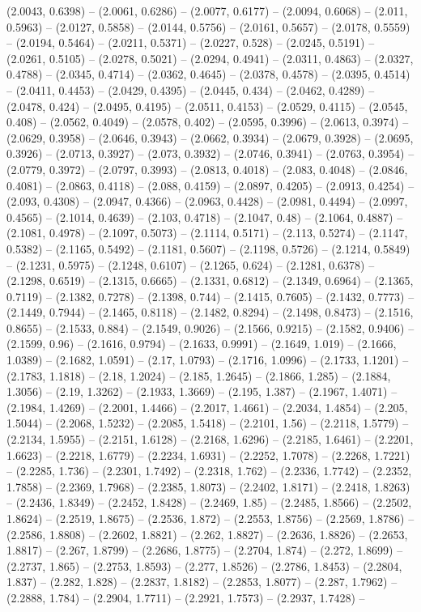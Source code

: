 (2.0043, 0.6398) -- (2.0061, 0.6286) -- (2.0077, 0.6177) -- (2.0094, 0.6068) -- (2.011, 0.5963) -- (2.0127, 0.5858) -- (2.0144, 0.5756) -- (2.0161, 0.5657) -- (2.0178, 0.5559) -- (2.0194, 0.5464) -- (2.0211, 0.5371) -- (2.0227, 0.528) -- (2.0245, 0.5191) -- (2.0261, 0.5105) -- (2.0278, 0.5021) -- (2.0294, 0.4941) -- (2.0311, 0.4863) -- (2.0327, 0.4788) -- (2.0345, 0.4714) -- (2.0362, 0.4645) -- (2.0378, 0.4578) -- (2.0395, 0.4514) -- (2.0411, 0.4453) -- (2.0429, 0.4395) -- (2.0445, 0.434) -- (2.0462, 0.4289) -- (2.0478, 0.424) -- (2.0495, 0.4195) -- (2.0511, 0.4153) -- (2.0529, 0.4115) -- (2.0545, 0.408) -- (2.0562, 0.4049) -- (2.0578, 0.402) -- (2.0595, 0.3996) -- (2.0613, 0.3974) -- (2.0629, 0.3958) -- (2.0646, 0.3943) -- (2.0662, 0.3934) -- (2.0679, 0.3928) -- (2.0695, 0.3926) -- (2.0713, 0.3927) -- (2.073, 0.3932) -- (2.0746, 0.3941) -- (2.0763, 0.3954) -- (2.0779, 0.3972) -- (2.0797, 0.3993) -- (2.0813, 0.4018) -- (2.083, 0.4048) -- (2.0846, 0.4081) -- (2.0863, 0.4118) -- (2.088, 0.4159) -- (2.0897, 0.4205) -- (2.0913, 0.4254) -- (2.093, 0.4308) -- (2.0947, 0.4366) -- (2.0963, 0.4428) -- (2.0981, 0.4494) -- (2.0997, 0.4565) -- (2.1014, 0.4639) -- (2.103, 0.4718) -- (2.1047, 0.48) -- (2.1064, 0.4887) -- (2.1081, 0.4978) -- (2.1097, 0.5073) -- (2.1114, 0.5171) -- (2.113, 0.5274) -- (2.1147, 0.5382) -- (2.1165, 0.5492) -- (2.1181, 0.5607) -- (2.1198, 0.5726) -- (2.1214, 0.5849) -- (2.1231, 0.5975) -- (2.1248, 0.6107) -- (2.1265, 0.624) -- (2.1281, 0.6378) -- (2.1298, 0.6519) -- (2.1315, 0.6665) -- (2.1331, 0.6812) -- (2.1349, 0.6964) -- (2.1365, 0.7119) -- (2.1382, 0.7278) -- (2.1398, 0.744) -- (2.1415, 0.7605) -- (2.1432, 0.7773) -- (2.1449, 0.7944) -- (2.1465, 0.8118) -- (2.1482, 0.8294) -- (2.1498, 0.8473) -- (2.1516, 0.8655) -- (2.1533, 0.884) -- (2.1549, 0.9026) -- (2.1566, 0.9215) -- (2.1582, 0.9406) -- (2.1599, 0.96) -- (2.1616, 0.9794) -- (2.1633, 0.9991) -- (2.1649, 1.019) -- (2.1666, 1.0389) -- (2.1682, 1.0591) -- (2.17, 1.0793) -- (2.1716, 1.0996) -- (2.1733, 1.1201) -- (2.1783, 1.1818) -- (2.18, 1.2024) -- (2.185, 1.2645) -- (2.1866, 1.285) -- (2.1884, 1.3056) -- (2.19, 1.3262) -- (2.1933, 1.3669) -- (2.195, 1.387) -- (2.1967, 1.4071) -- (2.1984, 1.4269) -- (2.2001, 1.4466) -- (2.2017, 1.4661) -- (2.2034, 1.4854) -- (2.205, 1.5044) -- (2.2068, 1.5232) -- (2.2085, 1.5418) -- (2.2101, 1.56) -- (2.2118, 1.5779) -- (2.2134, 1.5955) -- (2.2151, 1.6128) -- (2.2168, 1.6296) -- (2.2185, 1.6461) -- (2.2201, 1.6623) -- (2.2218, 1.6779) -- (2.2234, 1.6931) -- (2.2252, 1.7078) -- (2.2268, 1.7221) -- (2.2285, 1.736) -- (2.2301, 1.7492) -- (2.2318, 1.762) -- (2.2336, 1.7742) -- (2.2352, 1.7858) -- (2.2369, 1.7968) -- (2.2385, 1.8073) -- (2.2402, 1.8171) -- (2.2418, 1.8263) -- (2.2436, 1.8349) -- (2.2452, 1.8428) -- (2.2469, 1.85) -- (2.2485, 1.8566) -- (2.2502, 1.8624) -- (2.2519, 1.8675) -- (2.2536, 1.872) -- (2.2553, 1.8756) -- (2.2569, 1.8786) -- (2.2586, 1.8808) -- (2.2602, 1.8821) -- (2.262, 1.8827) -- (2.2636, 1.8826) -- (2.2653, 1.8817) -- (2.267, 1.8799) -- (2.2686, 1.8775) -- (2.2704, 1.874) -- (2.272, 1.8699) -- (2.2737, 1.865) -- (2.2753, 1.8593) -- (2.277, 1.8526) -- (2.2786, 1.8453) -- (2.2804, 1.837) -- (2.282, 1.828) -- (2.2837, 1.8182) -- (2.2853, 1.8077) -- (2.287, 1.7962) -- (2.2888, 1.784) -- (2.2904, 1.7711) -- (2.2921, 1.7573) -- (2.2937, 1.7428) -- 